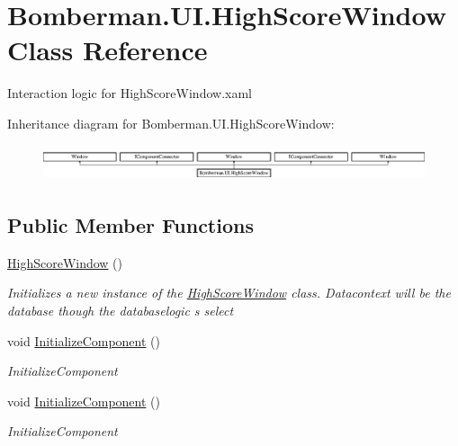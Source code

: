 \hypertarget{class_bomberman_1_1_u_i_1_1_high_score_window}{}\section{Bomberman.\+U\+I.\+High\+Score\+Window Class Reference}
\label{class_bomberman_1_1_u_i_1_1_high_score_window}


Interaction logic for High\+Score\+Window.\+xaml  


Inheritance diagram for Bomberman.\+U\+I.\+High\+Score\+Window\+:\begin{figure}[H]
\begin{center}
\leavevmode
\includegraphics[height=1.071770cm]{class_bomberman_1_1_u_i_1_1_high_score_window}
\end{center}
\end{figure}
\subsection*{Public Member Functions}
\begin{DoxyCompactItemize}
\item 
\mbox{\hyperlink{class_bomberman_1_1_u_i_1_1_high_score_window_a2fda3721b85ba6cd8013292b54ff5946}{High\+Score\+Window}} ()
\begin{DoxyCompactList}\small\item\em Initializes a new instance of the \mbox{\hyperlink{class_bomberman_1_1_u_i_1_1_high_score_window}{High\+Score\+Window}} class. Datacontext will be the database though the databaselogic s select \end{DoxyCompactList}\item 
void \mbox{\hyperlink{class_bomberman_1_1_u_i_1_1_high_score_window_af789760ffa4741aafc7c9b4cce8ba85f}{Initialize\+Component}} ()
\begin{DoxyCompactList}\small\item\em Initialize\+Component \end{DoxyCompactList}\item 
void \mbox{\hyperlink{class_bomberman_1_1_u_i_1_1_high_score_window_af789760ffa4741aafc7c9b4cce8ba85f}{Initialize\+Component}} ()
\begin{DoxyCompactList}\small\item\em Initialize\+Component \end{DoxyCompactList}\end{DoxyCompactItemize}
